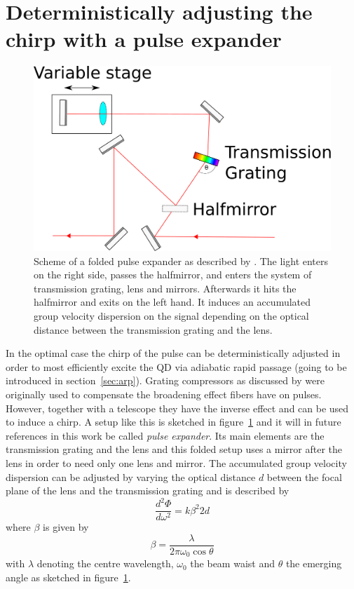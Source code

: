 \section{Deterministically adjusting the chirp with a pulse expander}
\label{sec:pulse-expander}
\begin{figure}[H]
	\centering
	\includegraphics[width=0.7\linewidth]{figures/chirp/pulse-expander}
	\caption{Scheme of a folded pulse expander as described by \textcite{martinez_3000_1987}.
		The light enters on the right side, passes the halfmirror, and enters the system of transmission grating, lens and mirrors.
		Afterwards it hits the halfmirror and exits on the left hand.
		It induces an accumulated group velocity dispersion on the signal depending on the optical distance between the transmission grating and the lens.}
	\label{fig:pulse-expander}
\end{figure}



In the optimal case the chirp of the pulse can be deterministically adjusted in order to most efficiently excite the \ac{QD} via adiabatic rapid passage (going to be introduced in section~\ref{sec:arp}).
Grating compressors as discussed by \textcite{martinez_3000_1987} were originally used to compensate the broadening effect fibers have on pulses.
However, together with a telescope they have the inverse effect and can be used to induce a chirp.
A setup like this is sketched in figure~\ref{fig:pulse-expander} and it will in future references in this work be called \textit{pulse expander}.
Its main elements are the transmission grating and the lens and this folded setup uses a mirror after the lens in order to need only one lens and mirror.
The accumulated group velocity dispersion can be adjusted by varying the optical distance $d$ between the focal plane of the lens and the transmission grating and is described by
\begin{equation}
\frac{d^2 \Phi}{d \omega^2} = k \beta^2 2 d
\end{equation}
where $\beta$ is given by
\begin{equation}
\beta = \frac{\lambda}{2 \pi \omega_0 \cos \theta}
\end{equation}
with $\lambda$ denoting the centre wavelength, $\omega_0$ the beam waist and $\theta$ the emerging angle as sketched in figure~\ref{fig:pulse-expander}.

